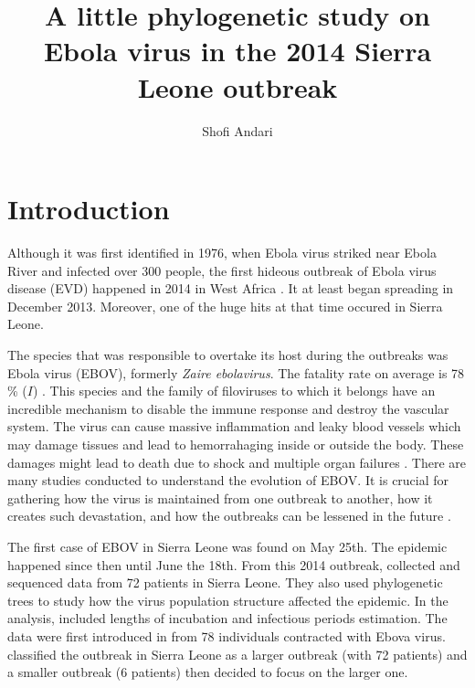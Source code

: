 \documentclass[11pt]{paper}
\title{A little phylogenetic study on Ebola virus in the 2014 Sierra Leone outbreak}
\author{Shofi Andari}
\begin{document}
\maketitle

\hypersetup{colorlinks=true,linkcolor=blue,anchorcolor=blue,citecolor=blue,filecolor=blue,urlcolor=blue,bookmarksnumbered=true,pdfview=FitB}


\section*{Introduction}
Although it was first identified in 1976, when Ebola virus striked near Ebola River and infected over 300 people, the first hideous outbreak  of Ebola virus disease (EVD) happened in 2014 in West Africa \cite{Do2016, Gire2014}.
It at least began spreading in December 2013. Moreover, one of the huge hits at that time occured in Sierra Leone. 

The species that was responsible to overtake its host during the outbreaks was Ebola virus (EBOV), formerly \textit{Zaire ebolavirus}. The fatality rate on average is 78 \% ($I$) \cite{Gire2014}.
This species and the family of filoviruses to which it belongs have an incredible mechanism to disable the immune response and destroy the vascular system. 
The virus can cause massive inflammation and leaky blood vessels \cite{PLOS2014} which may damage tissues and lead to hemorrahaging inside or outside the body. 
These damages might lead to death due to shock and multiple organ failures \cite{Servick2014}. 
There are many studies conducted to understand the evolution of EBOV. 
It is crucial for gathering how the virus is maintained from one outbreak to another, how it creates such devastation, and how the outbreaks can be lessened in the future \cite{Brown2016}.

The first case of EBOV in Sierra Leone was found on May 25th. 
The epidemic happened since then until June the 18th. 
From this 2014 outbreak, \cite{Stadler2014} collected and sequenced data from 72 patients in Sierra Leone. 
They also used phylogenetic trees to study how the virus population structure affected the epidemic.
In the analysis, \cite{Stadler2014} included lengths of incubation and infectious periods estimation.
The data were first introduced in \cite{Gire2014} from 78 individuals contracted with Ebova virus.
\cite{Stadler2014} classified the outbreak in Sierra Leone as a larger outbreak (with 72 patients) and a smaller outbreak (6 patients) then decided to focus on the larger one.
\end{document}
